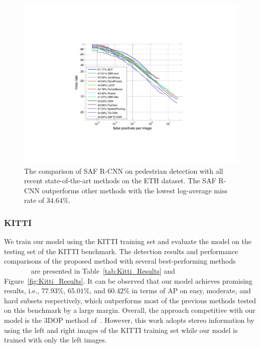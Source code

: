 \documentclass[journal]{IEEEtran}
\begin{document}
\begin{figure}
	\begin{center}
		\includegraphics[scale=0.55]{figures/ETH_Overall_Results.pdf}
		\caption{{The comparison of SAF R-CNN on pedestrian detection with all recent state-of-the-art methods on the ETH dataset. The SAF R-CNN outperforms other methods with the lowest log-average miss rate of $34.64\%$.}}
		\label{fig:ETH_Overall_Results}
	\end{center}
	\vspace{-4mm}
\end{figure}

\subsubsection{KITTI}
We train our model using the KITTI training set and evaluate the model on the testing set of the KITTI benchmark. The detection results and performance comparisons of the proposed method with several best-performing methods ~\cite{hosang2015taking}~\cite{paisitkriangkrai2014strengthening}~\cite{zhang2015filtered}~\cite{tian2015deep}~\cite{compact}~\cite{wang2013regionlets}~\cite{chen20153d} are presented in Table~\ref{tab:Kitti_Results} and Figure~\ref{fig:Kitti_Results}. It can be observed that our model achieves promising results, i.e., $77.93\%$, $65.01\%$, and $60.42\%$ in terms of AP on easy, moderate, and hard subsets respectively, which outperforms most of the previous methods tested on this benchmark by a large margin. Overall, the approach competitive with our model is the 3DOP method of~\cite{chen20153d}. However, this work adopts stereo information by using the left and right images of the KITTI training set while our model is trained with only the left images.
\end{document}
